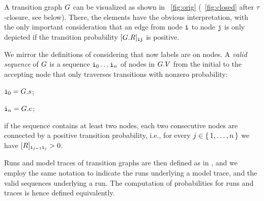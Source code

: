 A transition graph $G$ can be visualized as shown in \figurename~\ref{fig:orig} (\figurename~\ref{fig:closed} after $\tau$-closure, see below). There, the elements have the obvious interpretation, with the only important consideration that an edge from node $\textnormal{\texttt{i}}$ to node $\textnormal{\texttt{j}}$ is only depicted if the transition probability $[G.R]_{\textnormal{\texttt{i}}\textnormal{\texttt{j}}}$ is positive.

%


We mirror the definitions of  considering that now labels are on nodes. A \emph{valid sequence} of $G$ is a sequence $\textnormal{\texttt{i}}_0\ldots\textnormal{\texttt{i}}_n$ of nodes in $G.V$ from the initial to the accepting node that only traverses transitions with nonzero probability:
\begin{inparaenum}[\it (i)]
\item $\textnormal{\texttt{i}}_0 = G.s$;
\item $\textnormal{\texttt{i}}_n = G.e$;
\item if the sequence contains at least two nodes, each two consecutive nodes are connected by a positive transition probability, i.e., for every $j \in \set{1,\ldots,n}$ we have $[R]_{\textnormal{\texttt{i}}_{j-1}\textnormal{\texttt{i}}_{j}} > 0$.
\end{inparaenum}
Runs and model traces of transition graphs are then defined as in , and we employ the same notation to indicate the runs underlying a model trace, and the valid sequences underlying a run. The computation of probabilities for runs and traces is hence defined equivalently.

